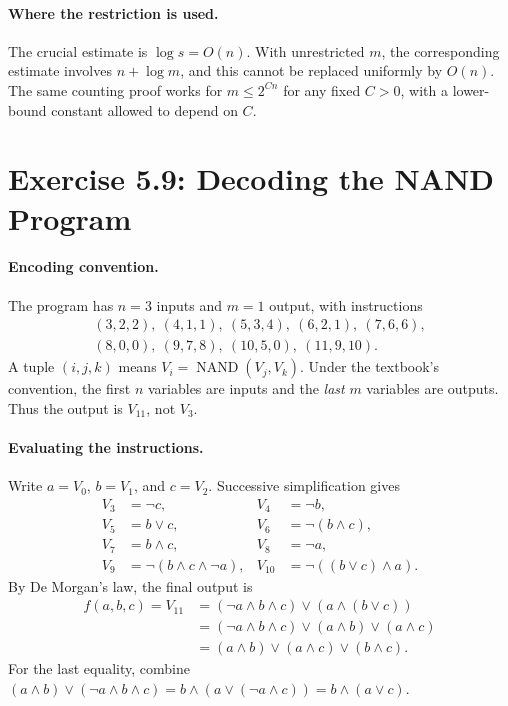 \documentclass[UTF8,fontset=fandol,11pt,a4paper]{ctexart}
\newcommand{\NAND}{\operatorname{NAND}}
\begin{document}
\paragraph{Where the restriction is used.}
The crucial estimate is $\log s=O(n)$. With unrestricted $m$, the
corresponding estimate involves $n+\log m$, and this cannot be
replaced uniformly by $O(n)$.
The same counting proof works for $m\le2^{Cn}$ for any fixed $C>0$,
with a lower-bound constant allowed to depend on $C$.

\section{Exercise 5.9: Decoding the NAND Program}

\paragraph{Encoding convention.}
The program has $n=3$ inputs and $m=1$ output, with instructions
\[
\begin{gathered}
 (3,2,2),\ (4,1,1),\ (5,3,4),\ (6,2,1),\ (7,6,6),\\
 (8,0,0),\ (9,7,8),\ (10,5,0),\ (11,9,10).
\end{gathered}
\]
A tuple $(i,j,k)$ means $V_i=\NAND(V_j,V_k)$.
Under the textbook's convention, the first $n$ variables are inputs
and the \emph{last} $m$ variables are outputs. Thus the output is
$V_{11}$, not $V_3$.

\paragraph{Evaluating the instructions.}
Write $a=V_0$, $b=V_1$, and $c=V_2$. Successive simplification gives
\begin{align*}
 V_3&=\neg c,& V_4&=\neg b,\\
 V_5&=b\lor c,& V_6&=\neg(b\land c),\\
 V_7&=b\land c,& V_8&=\neg a,\\
 V_9&=\neg(b\land c\land\neg a),&
 V_{10}&=\neg((b\lor c)\land a).
\end{align*}
By De Morgan's law, the final output is
\begin{align*}
 f(a,b,c)=V_{11}
 &=(\neg a\land b\land c)\lor(a\land(b\lor c))\\
 &=(\neg a\land b\land c)\lor(a\land b)\lor(a\land c)\\
 &=(a\land b)\lor(a\land c)\lor(b\land c).
\end{align*}
For the last equality, combine
$(a\land b)\lor(\neg a\land b\land c)
=b\land(a\lor(\neg a\land c))=b\land(a\lor c)$.
\end{document}
